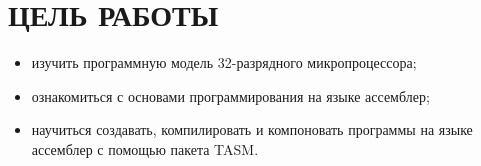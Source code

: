\section{ЦЕЛЬ РАБОТЫ}

\begin{itemize}
\item изучить программную модель 32-разрядного микропроцессора;

\item ознакомиться с основами программирования на языке ассемблер;

\item научиться создавать, компилировать и компоновать программы
  на языке ассемблер с помощью пакета TASM.
\end{itemize}

\newpage